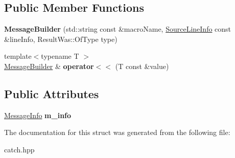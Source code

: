 \subsection*{Public Member Functions}
\begin{DoxyCompactItemize}
\item 
{\bfseries Message\+Builder} (std\+::string const \&macro\+Name, \hyperlink{structCatch_1_1SourceLineInfo}{Source\+Line\+Info} const \&line\+Info, Result\+Was\+::\+Of\+Type type)\hypertarget{structCatch_1_1MessageBuilder_ab0c6378e722680bf58852c6ee2b6e724}{}\label{structCatch_1_1MessageBuilder_ab0c6378e722680bf58852c6ee2b6e724}

\item 
{\footnotesize template$<$typename T $>$ }\\\hyperlink{structCatch_1_1MessageBuilder}{Message\+Builder} \& {\bfseries operator$<$$<$} (T const \&value)\hypertarget{structCatch_1_1MessageBuilder_a20fa48d069b20dddcc2d3df8abb123c1}{}\label{structCatch_1_1MessageBuilder_a20fa48d069b20dddcc2d3df8abb123c1}

\end{DoxyCompactItemize}
\subsection*{Public Attributes}
\begin{DoxyCompactItemize}
\item 
\hyperlink{structCatch_1_1MessageInfo}{Message\+Info} {\bfseries m\+\_\+info}\hypertarget{structCatch_1_1MessageBuilder_a979f1c2b36d78f80ee275bfa5ba0209f}{}\label{structCatch_1_1MessageBuilder_a979f1c2b36d78f80ee275bfa5ba0209f}

\end{DoxyCompactItemize}


The documentation for this struct was generated from the following file\+:\begin{DoxyCompactItemize}
\item 
catch.\+hpp\end{DoxyCompactItemize}
